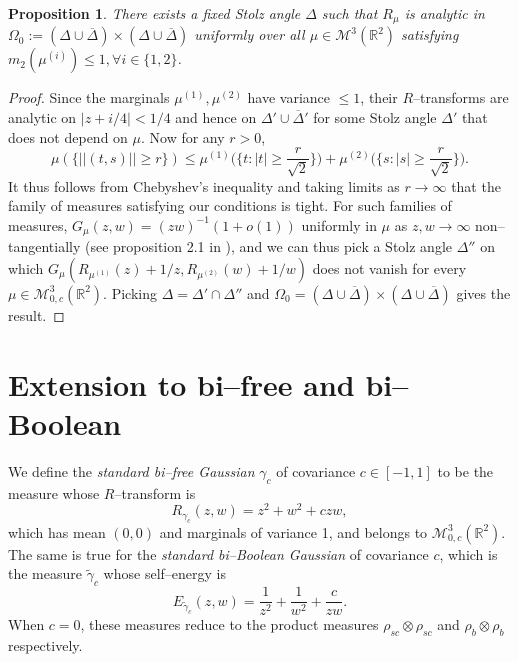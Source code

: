 \documentclass{amsart}
\newtheorem{proposition}[theorem]{Proposition}
\theoremstyle{definition}
\theoremstyle{remark}
\numberwithin{equation}{section}
\begin{document}
\begin{proposition}\label{commondomain}
    There exists a fixed Stolz angle $\Delta$ such that $R_\mu$ is analytic in $\Omega_0 :=(\Delta\cup\overline{\Delta})\times(\Delta\cup\overline{\Delta})$ uniformly over all $\mu\in \mathcal{M}^3(\mathbb{R}^2)$ satisfying $m_2(\mu^{(i)})\leq 1, \forall i\in \{1,2\}$.
\end{proposition}
\begin{proof}
     Since the marginals $\mu^{(1)}, \mu^{(2)}$ have variance $\leq 1$, their $R$--transforms are analytic on $|z+i/4|<1/4$ and hence on $\Delta' \cup \overline{\Delta}'$ for some Stolz angle $\Delta'$ that does not depend on $\mu$.
    Now for any $r>0$, 
    \[
        \mu(\{||(t,s)||\geq r\}) \leq \mu^{(1)}\bigg(\bigg\{t:|t|\geq \frac{r}{\sqrt{2}}\bigg\}\bigg)+\mu^{(2)}\bigg(\bigg\{s:|s|\geq \frac{r}{\sqrt{2}}\bigg\}\bigg).
    \]
    It thus follows from Chebyshev's inequality and taking limits as $r\to\infty$ that the family of measures satisfying our conditions is tight. For such families of measures, $G_\mu(z,w)=(zw)^{-1}(1+o(1)) $
    uniformly in $\mu$ as $z,w\to\infty$ non--tangentially (see proposition 2.1 in \cite{HasebeHuangWang}), and we can thus pick a Stolz angle $\Delta''$ on which $G_\mu(R_{\mu^{(1)}}(z)+1/z,R_{\mu^{(2)}}(w)+1/w) $
    does not vanish for every $\mu\in \mathcal{M}_{0,c}^3(\mathbb{R}^2)$. Picking $\Delta=\Delta'\cap \Delta''$ and $\Omega_0=(\Delta\cup \overline{\Delta})\times (\Delta\cup\overline{\Delta})$ gives the result.
\end{proof}


\section{Extension to bi--free and bi--Boolean}
We define the \textit{standard bi--free Gaussian} $\gamma_c$ of covariance $c\in [-1,1]$  to be the measure whose $R$--transform is 
\[
    R_{\gamma_c}(z,w)=z^2+w^2+czw,
\]
which has mean $(0,0)$ and marginals of variance 1, and belongs to $\mathcal{M}_{0,c}^3(\mathbb{R}^2)$. The same is true for the \textit{standard bi--Boolean Gaussian} of covariance $c$, which is the measure $\tilde{\gamma}_c$ whose self--energy is
\[
    E_{\tilde{\gamma}_c}(z,w)=\frac{1}{z^2}+\frac{1}{w^2}+\frac{c}{zw}.
\]
When $c=0$, these measures reduce to the product measures $\rho_{sc}\otimes \rho_{sc}$ and $\rho_b\otimes\rho_b$ respectively. 
\end{document}
